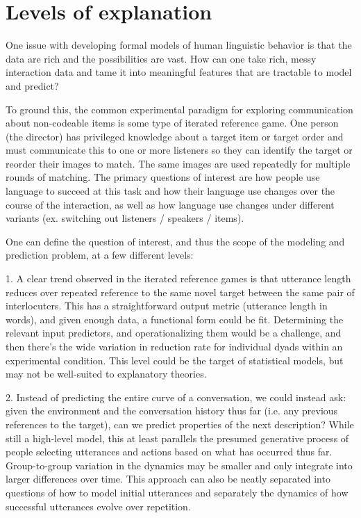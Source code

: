 \documentclass[]{article}
\begin{document}
	
	\section{Levels of explanation}
	One issue with developing formal models of human linguistic behavior is that the data are rich and the possibilities are vast. How can one take rich, messy interaction data and tame it into meaningful features that are tractable to model and predict? 
	
	To ground this, the common experimental paradigm for exploring communication about non-codeable items is some type of iterated reference game. One person (the director) has privileged knowledge about a target item or target order and must communicate this to one or more listeners so they can identify the target or reorder their images to match. The same images are used repeatedly for multiple rounds of matching. The primary questions of interest are how people use language to succeed at this task and how their language use changes over the course of the interaction, as well as how language use changes under different variants (ex. switching out listeners / speakers / items). 
	
	One can define the question of interest, and thus the scope of the modeling and prediction problem, at a few different levels:
	
	
	1. A clear trend observed in the iterated reference games is that utterance length reduces over repeated reference to the same novel target between the same pair of interlocuters. This has a straightforward output metric (utterance length in words), and given enough data, a functional form could be fit.  Determining the relevant input predictors, and operationalizing them would be a challenge, and then there's the wide variation in reduction rate for individual dyads within an experimental condition. This level could be the target of statistical models, but may not be well-suited to explanatory theories. 
	
	2. Instead of predicting the entire curve of a conversation, we could instead ask: given the environment and the conversation history thus far (i.e. any previous references to the target), can we predict properties of the next description? While still a high-level model, this at least parallels the presumed generative process of people selecting utterances and actions based on what has occurred thus far. Group-to-group variation in the dynamics may be smaller and only integrate into larger differences over time. This approach can also be neatly separated into questions of how to model initial utterances and separately the dynamics of how successful utterances evolve over repetition. 
	
\end{document}
